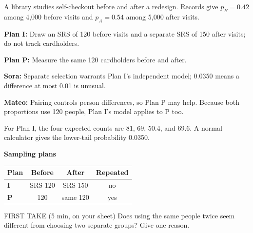 \documentclass[14pt]{extarticle}
\begin{document}
\pagestyle{empty}


\noindent\begin{minipage}[t]{0.57\linewidth}
\vspace{0pt}
A library studies self-checkout before and after a redesign. Records give $p_B=0.42$ among 4{,}000 before visits and $p_A=0.54$ among 5{,}000 after visits.\par\smallskip \textbf{Plan I:} Draw an SRS of 120 before visits and a separate SRS of 150 after visits; do not track cardholders.\par \textbf{Plan P:} Measure the same 120 cardholders before and after.\par\smallskip \textbf{Sora:} Separate selection warrants Plan I's independent model; 0.0350 means a difference at most 0.01 is unusual.\par \textbf{Mateo:} Pairing controls person differences, so Plan P may help. Because both proportions use 120 people, Plan I's model applies to P too.\par\smallskip For Plan I, the four expected counts are 81, 69, 50.4, and 69.6. A normal calculator gives the lower-tail probability 0.0350.\par
\end{minipage}\hfill
\begin{minipage}[t]{0.40\linewidth}
\vspace{0pt}
\begin{center}
\textbf{Sampling plans}\par\smallskip
\begin{tabular}{|l|c|c|c|}
\hline
\textbf{Plan} & \textbf{Before} & \textbf{After} & \textbf{Repeated} \\ \hline
\textbf{I} & SRS 120 & SRS 150 & no \\ \hline
\textbf{P} & 120 & same 120 & yes \\ \hline
\end{tabular}
\end{center}
\end{minipage}

\begin{firsttakebox}{FIRST TAKE (5 min, on your sheet)}
Does using the same people twice seem different from choosing two separate groups? Give one reason.
\end{firsttakebox}
\end{document}
